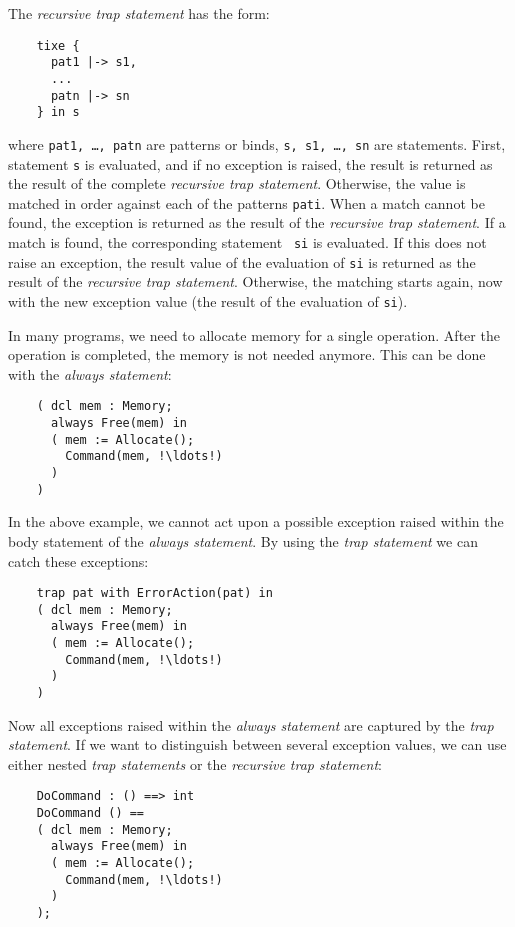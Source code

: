 \documentclass{overturerepchap}
\begin{document}
{\begin{description}
  The {\it recursive trap statement\/} has the form:
  \begin{lstlisting}
    tixe {
      pat1 |-> s1,
      ...
      patn |-> sn
    } in s
  \end{lstlisting}
  where {\tt pat1, \ldots, patn} are patterns or binds, {\tt s, s1, \ldots,
    sn} are statements. First, statement {\tt s} is evaluated, and if no
  exception is raised, the result is returned as the result of the complete
  {\it recursive trap statement}. Otherwise, the value is matched in order
  against each of the patterns {\tt pati}. When a match cannot be found,
  the exception is returned as the result of the {\it recursive trap
    statement}. If a match is found, the corresponding statement {\tt
    si} is evaluated. If this does not raise an exception, the result value
  of the evaluation of {\tt si} is returned as the result of the {\it
    recursive trap statement}. Otherwise, the matching starts again, now
  with the new exception value (the result of the evaluation of {\tt si}).

\item[Examples:] In many programs, we need to allocate memory for a
  single operation. After the operation is completed, the memory is not
  needed anymore. This can be done with the {\it always statement}:
  \begin{lstlisting}
    ( dcl mem : Memory;
      always Free(mem) in
      ( mem := Allocate();
        Command(mem, !\ldots!)
      )
    )
  \end{lstlisting}
  In the above example, we cannot act upon a possible exception raised
  within the body statement of the {\it always statement}. By using the
  {\it trap statement\/} we can catch these exceptions:
  \begin{lstlisting}
    trap pat with ErrorAction(pat) in
    ( dcl mem : Memory;
      always Free(mem) in
      ( mem := Allocate();
        Command(mem, !\ldots!)
      )
    )
  \end{lstlisting}
  Now all exceptions raised within the {\it always statement\/} are
  captured by the {\it trap statement}. If we want to distinguish between
  several exception values, we can use either nested {\it trap
    statements\/} or the {\it recursive trap statement}:
  \begin{lstlisting}
    DoCommand : () ==> int
    DoCommand () ==
    ( dcl mem : Memory;
      always Free(mem) in
      ( mem := Allocate();
        Command(mem, !\ldots!)
      )
    );


\end{lstlisting}
\end{description}}
\end{document}

